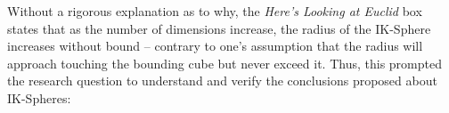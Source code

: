 Without a rigorous explanation as to why, the \textit{Here's Looking at Euclid} box states that as the number of dimensions increase, the radius of the IK-Sphere increases without bound -- contrary to one's assumption that the radius will approach touching the bounding cube but never exceed it. Thus, this prompted the research question to understand and verify the conclusions proposed about IK-Spheres: \researchquestion{}














